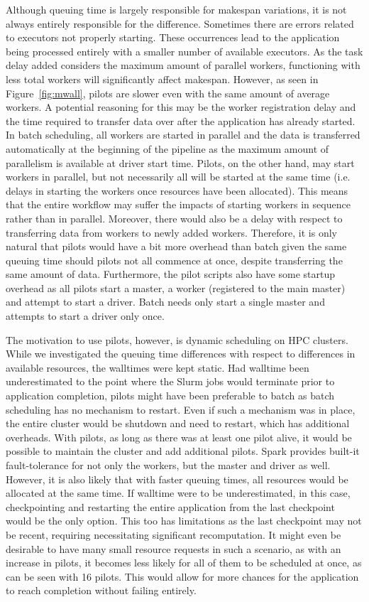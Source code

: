\documentclass{IEEEtran}
\begin{document}
Although queuing time is largely responsible for makespan variations, it is not
always entirely responsible for the difference. Sometimes there are errors related
to executors not properly starting. These occurrences lead to the 
application being processed entirely with a smaller number of available executors. As the task
delay added considers the maximum amount of parallel workers, functioning with less total workers
will significantly affect makespan. However, as seen in Figure~\ref{fig:mwall},
pilots are slower even with the same amount of average workers. A potential reasoning for this
may be the worker registration delay and the time required to transfer data
over after the application has already started. In batch scheduling, all workers are started in
parallel and the data is transferred automatically at the beginning of the pipeline as the maximum amount
of parallelism is available at driver start time. Pilots, on the other hand, may start workers in parallel,
but not necessarily all will be started at the same time (i.e. delays in starting the workers once resources
have been allocated). This means that the entire 
workflow may suffer the impacts of starting workers in sequence rather than in parallel. Moreover, there would also
be a delay with respect to transferring data from workers to newly added workers. Therefore,
it is only natural that pilots would have a bit more overhead than batch given the same
queuing time should pilots not all commence at once, despite transferring the same amount of data.
 Furthermore, the pilot scripts also
have some startup overhead as all pilots start a master, a worker (registered to the main
master) and attempt to start a driver. Batch needs only start a single master and attempts to start
a driver only once.

The motivation to use pilots, however, is dynamic scheduling on HPC clusters. While we
investigated the queuing time differences with respect to differences in available resources,
the walltimes were kept static. Had walltime been underestimated to the point where the Slurm jobs
would terminate prior to application completion, pilots might have been preferable to batch
as batch scheduling has no mechanism to restart. Even if such a mechanism was in place, the entire
cluster would be shutdown and need to restart, which has additional overheads. With pilots, as long as 
there was at least one pilot alive, it would be possible to maintain the cluster and add additional pilots.
Spark provides built-it fault-tolerance for not only the workers, but the master and driver as well. However,
it is also likely that with faster queuing times, all resources would be allocated at the same time. If walltime
were to be underestimated, in this case, checkpointing and restarting the entire application from the last
checkpoint would be the only option. This too has limitations as the last checkpoint may not be recent, requiring
necessitating significant recomputation. It
might even be desirable to have many small resource requests in such a scenario, as with an increase in pilots,
it becomes less likely for all of them to be scheduled at once, as can be seen with 16 pilots. This would allow
for more chances for the application to reach completion without failing entirely.
\end{document}

